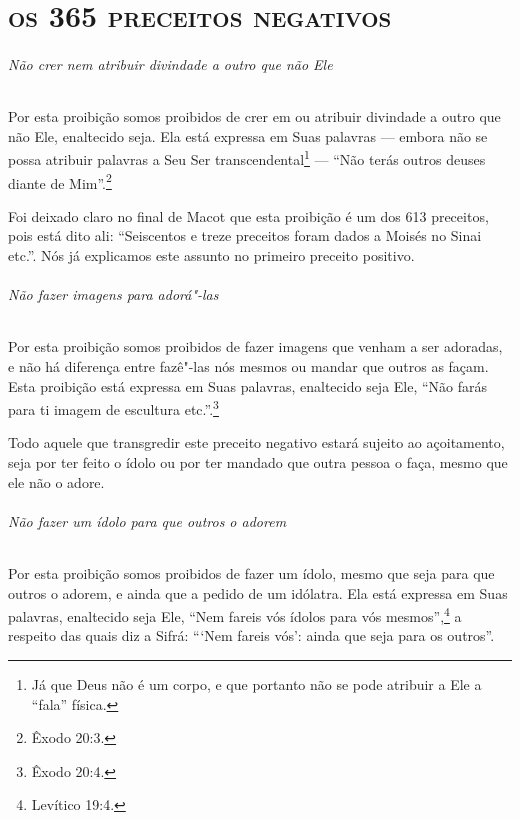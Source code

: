 \setcounter{footnote}{0}
\setcounter{secnumdepth}{-2}

\part{\textsc{os 365 preceitos negativos}}


\begin{multicols}{2}
\setcounter{paragraph}{0}
\setcounter{secnumdepth}{4}

\paragraph{Não crer nem atribuir divindade a outro que não Ele}

Por esta proibição somos proibidos de crer em ou atribuir divindade a
outro que não Ele, enaltecido seja. Ela está expressa em Suas palavras
--- embora não se possa atribuir palavras a Seu Ser
transcendental\footnote{Já que Deus não é um corpo, e que portanto não se pode atribuir a Ele a ``fala'' física.} --- ``Não terás outros deuses
diante de Mim''.\footnote{Êxodo 20:3.}

Foi deixado claro no final de Macot\starr{} que esta proibição é um dos 613
preceitos, pois está dito ali: ``Seiscentos e treze preceitos foram
dados a Moisés no Sinai etc.''. Nós já explicamos este assunto no
primeiro preceito positivo.

\paragraph{Não fazer imagens para adorá"-las}

Por esta proibição somos proibidos de fazer imagens que venham a ser
adoradas, e não há diferença entre fazê"-las nós mesmos ou mandar que
outros as façam. Esta proibição está expressa em Suas palavras,
enaltecido seja Ele, ``Não farás para ti imagem de escultura etc.''.\footnote{Êxodo 20:4.}

Todo aquele que transgredir este preceito negativo estará sujeito ao
açoitamento, seja por ter feito o ídolo ou por ter mandado que outra
pessoa o faça, mesmo que ele não o adore.

\paragraph{Não fazer um ídolo para que outros o adorem}

Por esta proibição somos proibidos de fazer um ídolo, mesmo que seja
para que outros o adorem, e ainda que a pedido de um idólatra. Ela está
expressa em Suas palavras, enaltecido seja Ele, ``Nem fareis vós ídolos
para vós mesmos'',\footnote{Levítico 19:4.} a respeito das quais diz a Sifrá\starr:
```Nem fareis vós': ainda que seja para os outros''.


\end{multicols}
